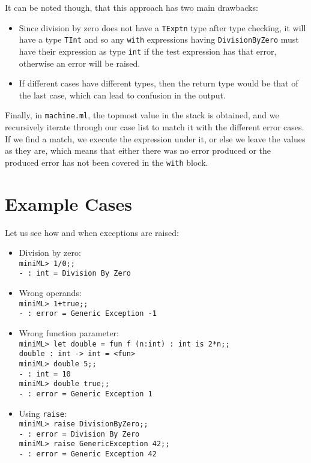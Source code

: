 \documentclass{article}
\begin{document}
        It can be noted though, that this approach has two main drawbacks:
        \begin{itemize}
            \item Since division by zero does not have a \texttt{TExptn} type after type checking, it will have a type \texttt{TInt} and so any \texttt{with} expressions having \texttt{DivisionByZero} must have their expression as type \texttt{int} if the test expression has that error, otherwise an error will be raised.
            \item If different cases have different types, then the return type would be that of the last case, which can lead to confusion in the output.
        \end{itemize}

        Finally, in \texttt{machine.ml}, the topmost value in the stack is obtained, and we recursively iterate through our case list to match it with the different error cases. If we find a match, we execute the expression under it, or else we leave the values as they are, which means that either there was no error produced or the produced error has not been covered in the \texttt{with} block.

    \newpage
\section{Example Cases}
    Let us see how and when exceptions are raised:
    \begin{itemize}
        \item Division by zero:\\\texttt{miniML> 1/0;;\\- : int = Division By Zero}
        \item Wrong operands:\\\texttt{miniML> 1+true;;\\- : error = Generic Exception -1}
        \item Wrong function parameter:\\\texttt{miniML> let double = fun f (n:int) : int is 2*n;;\\double : int -> int = <fun>\\miniML> double 5;;\\- : int = 10\\miniML> double true;;\\- : error = Generic Exception 1}
        \item Using \texttt{raise}:\\\texttt{miniML> raise DivisionByZero;;\\- : error = Division By Zero\\miniML> raise GenericException 42;;\\- : error = Generic Exception 42}
    \end{itemize}
\end{document}
